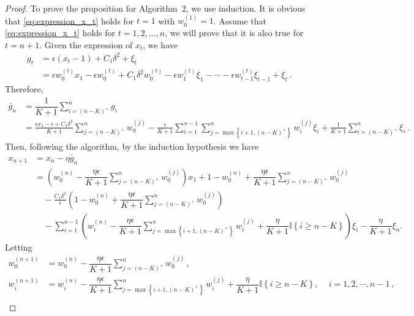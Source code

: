 \documentclass[11pt,letterpaper,english]{article}
\begin{document}
\begin{proof}
To prove the proposition for Algorithm~2, we use induction.
It is obvious that \eqref{eq:expression_x_t} holds for $t=1$ with $w^{(1)}_0=1$.
Assume that \eqref{eq:expression_x_t} holds for $t=1,2,\ldots,n$, we will prove that it is also true for $t=n+1$.
Given the expression of $x_t$, we have
\begin{align*}
g_t &= \epsilon (x_t-1) + C_1 \delta^2 + \xi_t \\
&= \epsilon w^{(t)}_0 x_1 - \epsilon w^{(t)}_0 + C_1 \delta^2w^{(t)}_0 -\epsilon w^{(t)}_1 \xi_1-\cdots-\epsilon w^{(t)}_{t-1} \xi_{t-1}+\xi_t \,.
\end{align*}
Therefore, 
\begin{align*}
\bar{g}_n &= \dfrac{1}{K+1}\sum_{i=(n-K)^+}^n g_i \\
& = \frac{\epsilon x_1-\epsilon +C_1\delta^2}{K+1} \sum_{j=(n-K)^+}^n w^{(j)}_0 
 - \frac{\epsilon}{K+1} \sum_{i=1}^{n-1} \sum_{j=\max\left\{i+1,(n-K)^+\right\}}^n w^{(j)}_{i} \xi_{i} 
+\frac{1}{K+1}\sum_{i=(n-K)^+}^n \xi_i \,.
\end{align*}
Then, following the algorithm, by the induction hypothesis we have
\begin{align*}
x_{n+1} &= x_n -\eta \bar{g}_n \\
&= \left( w^{(n)}_0-\dfrac{\eta \epsilon}{K+1} \sum_{j=(n-K)^+}^n w^{(j)}_0  \right)x_1
+1- w^{(n)}_0+\dfrac{\eta \epsilon}{K+1} \sum_{j=(n-K)^+}^n w^{(j)}_0 \\
&\quad - \frac{C_1 \delta^2}{\epsilon} \left(1- w^{(n)}_0+\dfrac{\eta \epsilon}{K+1} \sum_{j=(n-K)^+}^n w^{(j)}_0    \right) \\
&\quad -  \sum_{i=1}^{n-1} \left( w^{(n)}_i- \dfrac{\eta \epsilon}{K+1} \sum_{j=\max \left\{i+1,(n-K)^+\right\}}^n w^{(j)}_i +\dfrac{\eta}{K+1} \mathbb{I}\left\lbrace i \geq n-K \right\rbrace \right) \xi_i  -\dfrac{\eta}{K+1}\xi_n.
\end{align*}
Letting
\begin{align*}
w^{(n+1)}_0 &= w^{(n)}_0-\dfrac{\eta \epsilon}{K+1} \sum_{j=(n-K)^+}^n w^{(j)}_0  \,,\\
w^{(n+1)}_i &= w^{(n)}_i- \dfrac{\eta \epsilon}{K+1} \sum_{j=\max \left\{i+1,(n-K)^+\right\}}^n w^{(j)}_i +\dfrac{\eta}{K+1} \mathbb{I}\left\lbrace i \geq n-K \right\rbrace, \quad \,i=1,2,\cdots,n-1 \,, \\

\end{align*}
\end{proof}
\end{document}

